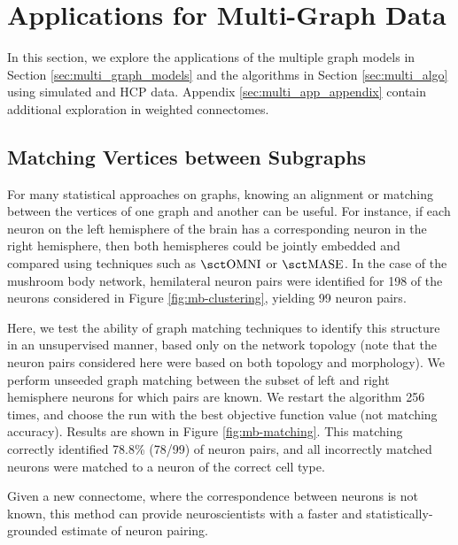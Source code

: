 \section{Applications for Multi-Graph Data}\label{sec:multi_app}
In this section, we explore the applications of the multiple graph models in Section \ref{sec:multi_graph_models} and the algorithms in Section \ref{sec:multi_algo} using simulated and HCP data. Appendix \ref{sec:multi_app_appendix} contain additional exploration in weighted connectomes. 

\subsection{Matching Vertices between Subgraphs} 
For many statistical approaches on graphs, knowing an alignment or matching between the vertices of one graph and another can be useful. For instance, if each neuron on the left hemisphere of the brain has a corresponding neuron in the right hemisphere, then both hemispheres could be jointly embedded and compared using techniques such as $\omni$ or $\mase$. In the case of the mushroom body network, hemilateral neuron pairs were identified for 198 of the neurons considered in Figure \ref{fig:mb-clustering}, yielding 99 neuron pairs. 

Here, we test the ability of graph matching techniques to identify this structure in an unsupervised manner, based only on the network topology (note that the neuron pairs considered here were based on both topology and morphology). We perform unseeded graph matching
between the subset of left and right hemisphere neurons for which pairs are known. We restart the algorithm 256 times, and choose the run with the best objective function value (not matching accuracy). Results are shown in Figure \ref{fig:mb-matching}. This matching correctly identified 78.8\% (78/99) of neuron pairs, and all incorrectly matched neurons were matched to a neuron of the correct cell type.

Given a new connectome, where the correspondence between neurons is not known, this method can provide neuroscientists with a faster and statistically-grounded estimate of neuron pairing. 

